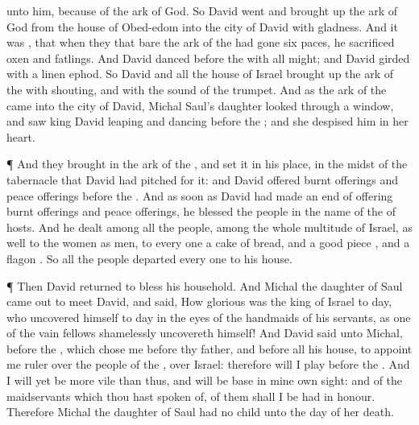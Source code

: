 {{} unto him, because of the
ark of
God. So
David
went and brought
up the
ark of
God from the
house of
Obed-edom into the
city of
David with
gladness.
And it was
{}, that when they that
bare the
ark of the
{} had
gone
six
paces, he
sacrificed
oxen and
fatlings.
And
David
danced
before the
{} with all
{}
might; and
David
{}
girded with a
linen
ephod.
So
David and all the
house of
Israel brought
up the
ark of the
{} with
shouting, and with the
sound of the
trumpet.
And as the
ark of the
{}
came into the
city of
David,
Michal
Saul’s
daughter
looked through a
window, and
saw
king
David
leaping and
dancing
before the
{}; and she
despised him in her
heart.
\par }{\PP {}¶ And they
brought in the
ark of the
{}, and
set it in his
place, in the
midst of the
tabernacle that
David had
pitched for it: and
David
offered burnt
offerings and peace
offerings
before the
{}.
And as soon as
David had made an
end of
offering burnt
offerings and peace
offerings, he
blessed the
people in the
name of the
{} of
hosts.
And he
dealt among all the
people,
{} among the whole
multitude of
Israel, as well to the
women as
men, to every
one
a
cake of
bread, and a good
piece
{}, and a
flagon
{}. So all the
people
departed every
one to his
house.
\par }{\PP {}¶ Then
David
returned to
bless his
household. And
Michal the
daughter of
Saul came
out to
meet
David, and
said, How
glorious was the
king of
Israel to
day, who
uncovered himself to
day in the
eyes of the
handmaids of his
servants, as
one of the vain
fellows
shamelessly
uncovereth himself!
And
David
said unto
Michal,
{}
before the
{}, which
chose me before thy
father, and before all his
house, to
appoint me
ruler over the
people of the
{}, over
Israel: therefore will I
play
before the
{}.
And I will yet be more
vile than
thus, and will be
base in mine own
sight: and of the
maidservants which thou hast
spoken of, of them shall I be had in
honour.
Therefore
Michal the
daughter of
Saul had no
child unto the
day of her
death.

}

